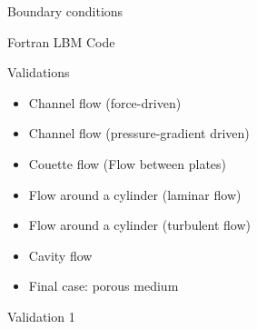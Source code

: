 \documentclass{beamer}
\begin{document}
	\begin{frame}{Boundary conditions}
	\end{frame}

	\begin{frame}{Fortran LBM Code}
	\end{frame}

	\begin{frame}{Validations}
		\begin{itemize}
			\item Channel flow (force-driven)
			\item Channel flow (pressure-gradient driven)
			\item Couette flow (Flow between plates)
			\item Flow around a cylinder (laminar flow)
			\item Flow around a cylinder (turbulent flow)
			\item Cavity flow
			\item Final case: porous medium
		\end{itemize}
	\end{frame}
	
	\begin{frame}{Validation 1}
	\end{frame}
	
\end{document}
